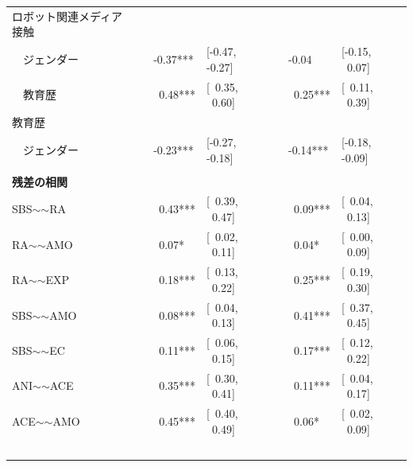 \documentclass[a4j,12pt]{jreport}
\begin{document}
\begin{table}[H]
{\begin{threeparttable}
\begin{tabular}{@{}lllllll@{}}
ロボット関連メディア接触     &  &                               &                      &  &                               &                      \\
~~ジェンダー                          &  & -0.37***                      & {[}-0.47, -0.27{]}   &  & -0.04                         & {[}-0.15, ~0.07{]}  \\
~~教育歴                       &  & ~0.48***                     & {[}~0.35, ~0.60{]} &  & ~0.25***                     & {[}~0.11, ~0.39{]} \\
教育歴                           &  &                               &                      &  &                               &                      \\
~~ジェンダー                          &  & -0.23***                      & {[}-0.27, -0.18{]}   &  & -0.14***                      & {[}-0.18, -0.09{]}   \\
                                    &  &                               &                      &  &                               &                      \\
\textbf{残差の相関}                &  &                               &                      &  &                               &                      \\
SBS$\sim$$\sim$RA                   &  & ~0.43***                     & {[}~0.39, ~0.47{]} &  & ~0.09***                     & {[}~0.04, ~0.13{]} \\
RA$\sim$$\sim$AMO                   &  & ~0.07* & {[}~0.02, ~0.11{]} &  & ~0.04* & {[}~0.00, ~0.09{]} \\
RA$\sim$$\sim$EXP                   &  & ~0.18***                     & {[}~0.13, ~0.22{]} &  & ~0.25***                     & {[}~0.19, ~0.30{]} \\
SBS$\sim$$\sim$AMO                  &  & ~0.08***                     & {[}~0.04, ~0.13{]} &  & ~0.41***                     & {[}~0.37, ~0.45{]} \\
SBS$\sim$$\sim$EC                   &  & ~0.11***                     & {[}~0.06, ~0.15{]} &  & ~0.17***                     & {[}~0.12, ~0.22{]} \\
ANI$\sim$$\sim$ACE                  &  & ~0.35***                     & {[}~0.30, ~0.41{]} &  & ~0.11***                     & {[}~0.04, ~0.17{]} \\
ACE$\sim$$\sim$AMO                  &  & ~0.45***                     & {[}~0.40, ~0.49{]} &  & ~0.06* & {[}~0.02, ~0.09{]} \\
$$
\end{tabular}
\end{threeparttable}}
\end{table}
\end{document}

